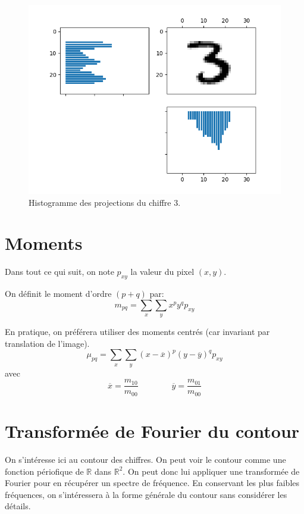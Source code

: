 \begin{figure}[h]
  \centering
  \includegraphics[scale=0.5]{assets/features-hvhisto-ex1}
  \caption{Histogramme des projections du chiffre 3.}
  \label{fig:features-hvhisto-ex1}
\end{figure}



\section{Moments}



Dans tout ce qui suit, on note $p_{xy}$ la valeur du pixel $(x,y)$.

On définit le moment d'ordre $(p+q)$ par:
\[
m_{pq} = \sum_x \sum_y x^p y^q p_{xy}
\]

En pratique, on préférera utiliser des moments centrés (car invariant 
par translation de l'image).
\[
\mu_{pq} = \sum_x \sum_y (x - \overline{x})^p (y - \overline{y})^q p_{xy}
\]
avec 
\[
\overline{x} = \frac{m_{10}}{m_{00}} \qquad \qquad \overline{y} = \frac{m_{01}}{m_{00}}
\]



\section{Transformée de Fourier du contour}

On s'intéresse ici au contour des chiffres. 
On peut voir le contour comme une fonction périofique 
de $\mathbb{R}$ dans $\mathbb{R}^2$. 
On peut donc lui appliquer une transformée de Fourier pour 
en récupérer un spectre de fréquence. 
En conservant les plus faibles fréquences, on s'intéressera à 
la forme générale du contour sans considérer les détails.

